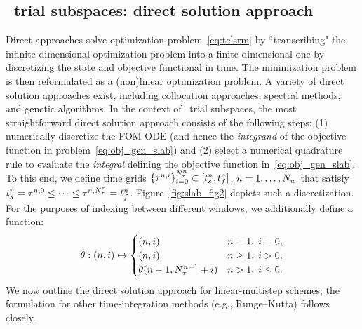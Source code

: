 \subsection{\spatialAcronym\ trial subspaces: direct solution approach}\label{sec:direct} 

Direct approaches solve optimization problem~\eqref{eq:tclsrm} by
``transcribing" the infinite-dimensional optimization problem into a finite-dimensional one by discretizing the state and objective functional in time.
The minimization problem is then reformulated as a (non)linear 
optimization problem. A variety of direct solution approaches exist, 
including collocation approaches, spectral  methods, and genetic algorithms.  
In the context of \spatialAcronym\ trial subspaces, the most straightforward direct solution approach consists of the 
following steps: (1) numerically discretize the FOM ODE (and hence the
\textit{integrand} of the objective function in problem~\eqref{eq:obj_gen_slab}) and 
(2) select a numerical quadrature rule to evaluate the \textit{integral}
defining the objective function in~\eqref{eq:obj_gen_slab}.
To this end, we define time grids
$\{\tau^{n,i}\}_{i=0}^{N_{\tau}^{n}}\subset[t_s^{n},t_f^{n}]$,
$n=1,\ldots,N_w$ that
satisfy 
$t_s^{n}=\tau^{n,0} \le \cdots \le \tau^{n,N_{\tau}^{n}} 
 = t_f^{n}$. %
Figure~\ref{fig:slab_fig2} depicts such a discretization.
For the purposes of indexing between different windows, we additionally define a function:
$$\theta: (n,i) \mapsto 
\begin{cases}
	(n,i) & n = 1, \; i = 0, \\
	(n,i) & n \geq 1, \; i > 0, \\
\theta(n-1,N_{\tau}^{n-1}+i) & n > 1, \; i \le 0.
\end{cases}$$
We now outline the direct solution approach for linear-multistep schemes; the formulation for
other time-integration methods (e.g., Runge--Kutta) follows closely. 
